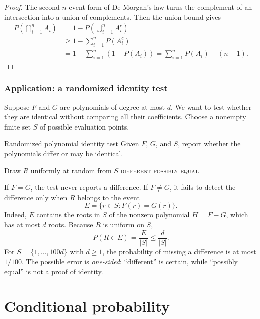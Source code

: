 \documentclass[a4paper,12pt,oneside]{report}
\begin{document}
\begin{proof}
The second $n$-event form of De Morgan's law turns the complement of
an intersection into a union of complements. Then the union bound gives
\[
\begin{aligned}
P\!\left(\bigcap_{i=1}^{n}A_i\right)
 &=1-P\!\left(\bigcup_{i=1}^{n}A_i^c\right)\\
 &\geq1-\sum_{i=1}^{n}P(A_i^c)\\
 &=1-\sum_{i=1}^{n}(1-P(A_i))
  =\sum_{i=1}^{n}P(A_i)-(n-1).
\end{aligned}
\]
\end{proof}

\subsection{Application: a randomized identity test}

Suppose $F$ and $G$ are polynomials of degree at most $d$. We want to
test whether they are identical without comparing all their coefficients.
Choose a nonempty finite set $S$ of possible evaluation points.

\begin{framedalgo}{Randomized polynomial identity test}\label{alg:identity-test}
Given $F$, $G$, and $S$, report whether the polynomials differ or may
be identical.
\begin{algorithmic}
    \State Draw $R$ uniformly at random from $S$
      \State \Return \textsc{different}
    \Else
      \State \Return \textsc{possibly equal}
    \EndIf
  \EndFunction
\end{algorithmic}
\end{framedalgo}

If $F=G$, the test never reports a difference. If $F\neq G$, it fails
to detect the difference only when $R$ belongs to the event
\[
  E=\{r\in S:F(r)=G(r)\}.
\]
Indeed, $E$ contains the roots in $S$ of the nonzero polynomial
$H=F-G$, which has at most $d$ roots. Because $R$ is uniform on $S$,
\[
  P(R\in E)=\frac{|E|}{|S|}\leq\frac{d}{|S|}.
\]
For $S=\{1,\ldots,100d\}$ with $d\geq1$, the probability of missing a
difference is at most $1/100$. The possible error is \emph{one-sided}:
``different'' is certain, while ``possibly equal'' is not a proof of
identity.

\chapter{Conditional probability}
\end{document}
